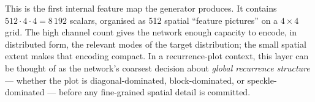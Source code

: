 
This is the first internal feature map the generator produces. It
contains $512 \cdot 4 \cdot 4 = 8\,192$ scalars, organised as 512 spatial
``feature pictures'' on a $4 \times 4$ grid. The high channel count gives
the network enough capacity to encode, in distributed form, the relevant
modes of the target distribution; the small spatial extent makes that
encoding compact. In a recurrence-plot context, this layer can be thought
of as the network's coarsest decision about \emph{global recurrence
structure} --- whether the plot is diagonal-dominated, block-dominated,
or speckle-dominated --- before any fine-grained spatial detail is
committed.

